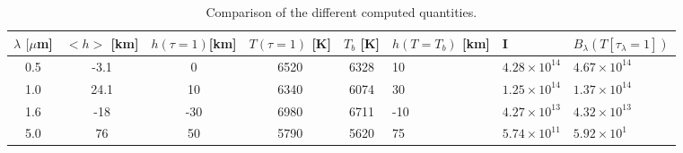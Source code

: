 \documentclass[a4paper,11.5pt,]{article}
\begin{document}
\begin{table}[H]
\centering
\caption{Comparison of the different computed quantities.  }
\label{tab: 1}
\begin{tabular}{|c|c|c|c|c|l|l|l|}
\hline
$\lambda$ $[\mu$m] & $< h > $ [km] & $h(\tau = 1)$[km] & $T(\tau = 1)$ [K] & $T_b$ [K] & $h(T=T_b)$ [km] & I                     & $B _ { \lambda } \left( T \left[ \tau _ { \lambda } = 1 \right] \right)$ \\ \hline
0.5                & -3.1          & 0                 & 6520               & 6328      & 10              & $4.28 \times 10^{14}$ & $4.67 \times 10^{14}$                                                    \\ \hline
1.0                & 24.1          & 10                & 6340               & 6074      & 30              & $1.25 \times 10^{14}$ & $1.37 \times 10^{14}$                                                    \\ \hline
1.6                & -18           & -30               & 6980               & 6711      & -10            & $4.27\times 10^{13}$  & $4.32 \times 10^{13}$                                                    \\ \hline
5.0                & 76            & 50                & 5790               & 5620      & 75              & $5.74 \times 10^{11}$ & $5.92 \times 10^{1}$                                                     \\ \hline
\end{tabular}
\end{table}
\end{document}

